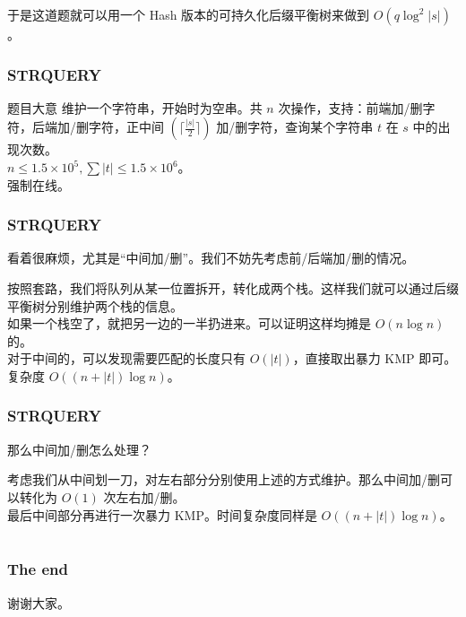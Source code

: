 \documentclass[UTF8]{beamer}
\begin{document}
\begin{CJK}{UTF8}{song}
\begin{frame}
	\pause
	\par
	于是这道题就可以用一个 Hash 版本的可持久化后缀平衡树来做到 $O(q\log^2 |s|)$。
\end{frame}
\begin{frame}
	\frametitle{STRQUERY}
	\begin{block}{题目大意}
	维护一个字符串，开始时为空串。共 $n$ 次操作，支持：前端加/删字符，后端加/删字符，正中间 $(\lceil\frac{|s|} 2\rceil)$ 加/删字符，查询某个字符串 $t$ 在 $s$ 中的出现次数。\\
	$n\leq 1.5\times 10^5,\sum |t| \leq 1.5\times 10^6$。\\
	强制在线。
	\end{block}
\end{frame}
\begin{frame}
	\frametitle{STRQUERY}
	看着很麻烦，尤其是“中间加/删”。我们不妨先考虑前/后端加/删的情况。
	\pause
	\par
	按照套路，我们将队列从某一位置拆开，转化成两个栈。这样我们就可以通过后缀平衡树分别维护两个栈的信息。\\
	如果一个栈空了，就把另一边的一半扔进来。可以证明这样均摊是 $O(n\log n)$ 的。\\
	对于中间的，可以发现需要匹配的长度只有 $O(|t|)$，直接取出暴力 KMP 即可。\\
	复杂度 $O((n+|t|)\log n)$。
\end{frame}
\begin{frame}
	\frametitle{STRQUERY}
	那么中间加/删怎么处理？\\
	\pause
	\par
	考虑我们从中间划一刀，对左右部分分别使用上述的方式维护。那么中间加/删可以转化为 $O(1)$ 次左右加/删。\\
	最后中间部分再进行一次暴力 KMP。时间复杂度同样是 $O((n+|t|)\log n)$。
\end{frame}
\section{}
\begin{frame}
	\frametitle{The end}
	谢谢大家。
\end{frame}
\end{CJK}
\end{document}
